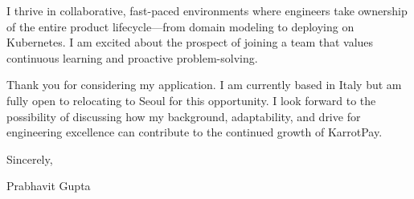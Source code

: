 \documentclass[11pt,a4paper]{article}
\begin{document}
I thrive in collaborative, fast-paced environments where engineers take ownership of the entire product lifecycle---from domain modeling to deploying on Kubernetes. I am excited about the prospect of joining a team that values continuous learning and proactive problem-solving.

Thank you for considering my application. I am currently based in Italy but am fully open to relocating to Seoul for this opportunity. I look forward to the possibility of discussing how my background, adaptability, and drive for engineering excellence can contribute to the continued growth of KarrotPay.

Sincerely,

\vspace{1em}
Prabhavit Gupta
\end{document}
